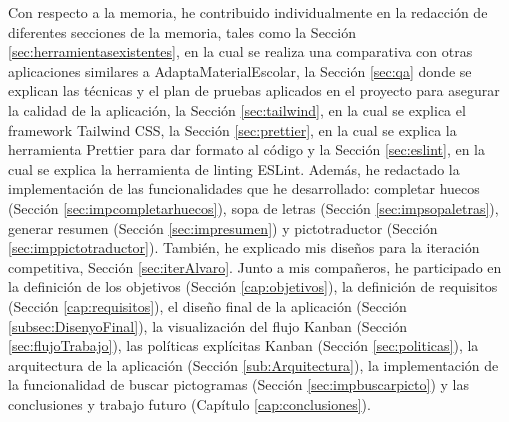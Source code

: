 Con respecto a la memoria, he contribuido individualmente en la redacción de diferentes secciones de la memoria, tales como la Sección \ref{sec:herramientasexistentes}, en la cual se realiza una comparativa con otras aplicaciones similares a AdaptaMaterialEscolar, la Sección \ref{sec:qa} donde se explican las técnicas y el plan de pruebas aplicados en el proyecto para asegurar la calidad de la aplicación, la Sección \ref{sec:tailwind}, en la cual se explica el framework Tailwind CSS, la Sección \ref{sec:prettier}, en la cual se explica la herramienta Prettier para dar formato al código y la Sección \ref{sec:eslint}, en la cual se explica la herramienta de linting ESLint. Además, he redactado la implementación de las funcionalidades que he desarrollado: completar huecos (Sección \ref{sec:impcompletarhuecos}), sopa de letras (Sección \ref{sec:impsopaletras}), generar resumen (Sección \ref{sec:impresumen}) y pictotraductor (Sección \ref{sec:imppictotraductor}). También, he explicado mis diseños para la iteración competitiva, Sección \ref{sec:iterAlvaro}. Junto a mis compañeros, he participado en la definición de los objetivos (Sección \ref{cap:objetivos}), la definición de requisitos (Sección \ref{cap:requisitos}), el diseño final de la aplicación (Sección \ref{subsec:DisenyoFinal}), la visualización del flujo Kanban (Sección \ref{sec:flujoTrabajo}), las políticas explícitas Kanban (Sección \ref{sec:politicas}), la arquitectura de la aplicación (Sección \ref{sub:Arquitectura}), la implementación de la funcionalidad de buscar pictogramas (Sección \ref{sec:impbuscarpicto}) y las conclusiones y trabajo futuro (Capítulo \ref{cap:conclusiones}).

